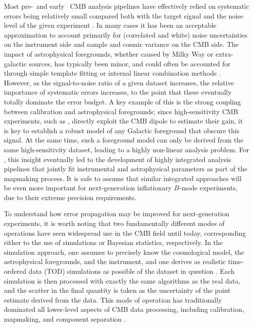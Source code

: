 \documentclass[twocolumn]{aa}
\begin{document}
Most pre-\Planck\ and early \Planck\ CMB analysis pipelines have
effectively relied on systematic errors being relatively small
compared both with the target signal and the noise level of the given
experiment \citep[e.g.,][]{bennett2012,planck2013-p01}. In many cases
it has been an acceptable approximation to account primarily for
(correlated and white) noise uncertainties on the instrument side and
sample and cosmic variance on the CMB side. The impact of
astrophysical foregrounds, whether caused by Milky Way or
extra-galactic sources, has typically been minor, and could often be
accounted for through simple template fitting or internal linear
combination methods
\citep[e.g.,][]{bennett2003b,planck2013-p06}. However, as the
signal-to-noise ratio of a given dataset increases, the relative
importance of systematic errors increases, to the point that these
eventually totally dominate the error budget. A key example of this is
the strong coupling between calibration and astrophysical foregrounds;
since high-sensitivity CMB experiments, such as \Planck, directly
exploit the CMB dipole to estimate their gain, it is key to establish
a robust model of any Galactic foreground that obscure this signal. At
the same time, such a foreground model can only be derived from the same
high-sensitivity dataset, leading to a highly non-linear analysis
problem. For \Planck, this insight eventually led to the development
of highly integrated analysis pipelines \citep{delouis:2019,npipe}
that jointly fit instrumental and astrophysical parameters as part of
the mapmaking process. It is safe to assume that similar integrated
approaches will be even more important for next-generation
inflationary $B$-mode experiments, due to their extreme precision
requirements.

To understand how error propagation may be improved for
next-generation experiments, it is worth noting that two fundamentally
different modes of operations have seen widespread use in the CMB
field until today, corresponding either to the use of simulations or
Bayesian statistics, respectively. In the simulation approach, one
assumes to precisely know the cosmological model, the astrophysical foregrounds, and the instrument, and one derives as realistic time-ordered data
(TOD) simulations as possible of the dataset in question
\citep[e.g.,][]{planck2014-a14}. Each simulation is then processed
with exactly the same algorithms as the real data, and the scatter in
the final quantity is taken as the uncertainty of the point estimate
derived from the data. This mode of operation has traditionally
dominated all lower-level aspects of CMB data processing, including
calibration, mapmaking, and component separation
\citep[e.g,][]{planck2014-a08,planck2016-l04}.
\end{document}
